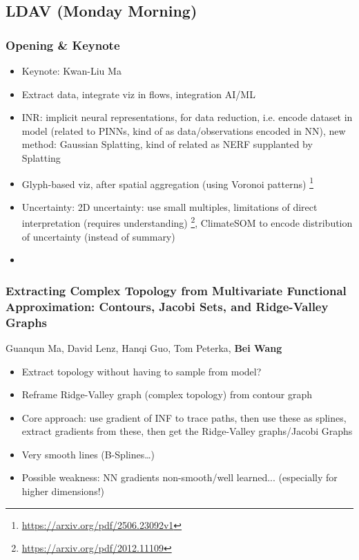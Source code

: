 \documentclass[a4paper]{article}
\begin{document}
\subsection{LDAV (Monday Morning)}
\subsubsection{Opening \& Keynote}
\begin{itemize}
    \item Keynote: Kwan-Liu Ma
    \item Extract data, integrate viz in flows, integration AI/ML
    \item INR:  implicit neural representations, for data reduction, i.e. encode dataset in model (related to PINNs, kind of as data/observations encoded in NN), new method: Gaussian Splatting, kind of related as NERF supplanted by Splatting
    \item Glyph-based viz, after spatial aggregation (using Voronoi patterns) \footnote{\url{https://arxiv.org/pdf/2506.23092v1}}
    \item Uncertainty:  2D uncertainty: use small multiples, limitations of direct interpretation (requires understanding) \footnote{\url{https://arxiv.org/pdf/2012.11109}}, ClimateSOM to encode distribution of uncertainty (instead of summary)
    \item
\end{itemize}
\subsubsection{Extracting Complex Topology from Multivariate Functional Approximation: Contours, Jacobi Sets, and Ridge-Valley Graphs} Guanqun Ma, David Lenz, Hanqi Guo, Tom Peterka, \textbf{Bei Wang}

\begin{itemize}
    \item Extract topology without having to sample from model?
    \item Reframe Ridge-Valley graph (complex topology) from contour graph
    \item Core approach: use gradient of INF to trace paths, then use these as splines, extract gradients from these, then get the Ridge-Valley graphs/Jacobi Graphs
    \item Very smooth lines (B-Splines\dots)
    \item Possible weakness: NN gradients non-smooth/well learned... (especially for higher dimensions!)
\end{itemize}
\end{document}
